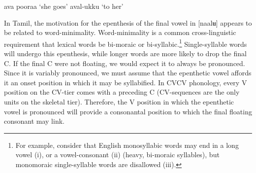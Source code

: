 \documentclass[output=paper]{langscibook}
\begin{document}
\begin{exe}
\ex \label{new20}
\begin{xlist}
\ex \label{new20a}
ava pooraa	\tab	`she goes' 
\ex \label{new20b}
aval-ukku 	\tab ‘to her' 
\end{xlist}
\end{exe}

In Tamil, the motivation for the epenthesis of the final vowel in [naalʉ] appears to be related to word-minimality. Word-minimality is a common cross-linguistic requirement that lexical words be bi-moraic or bi-syllabic.\footnote{For example, consider that English monosyllabic words may end in a long vowel (i), or a vowel-consonant (ii) (heavy, bi-moraic syllables), but monomoraic single-syllable words are disallowed (iii). 
\ex[*]{[bɪ]}
\z}   Single-syllable words will undergo this epenthesis, while longer words are more likely to drop the final C. If the final C were not floating, we would expect it to always be pronounced. Since it is variably pronounced, we must assume that the epenthetic vowel affords it an onset position in which it may be syllabified. In CVCV phonology, every V position on the CV-tier comes with a preceding C (CV-sequences are the only units on the skeletal tier). Therefore, the V position in which the epenthetic vowel is pronounced will provide a consonantal position to which the final floating consonant may link. 
\end{document}

